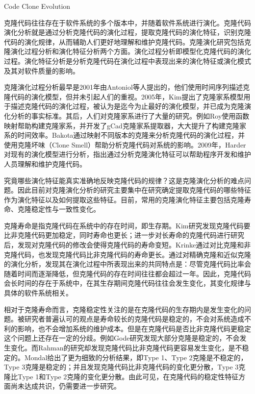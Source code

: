 {Code Clone Evolution}

克隆代码往往存在于软件系统的多个版本中，并随着软件系统进行演化。克隆代码演化分析就是通过分析克隆代码的演化过程，提取克隆代码的演化特征，识别克隆代码的演化规律，从而辅助人们更好地理解和维护克隆代码。克隆演化研究包括克隆演化过程分析和演化特征分析两个方面。演化过程分析即模型化克隆代码的演化过程。演化特征分析是分析克隆代码在演化过程中表现出来的演化特征或演化模式及其对软件质量的影响。

克隆演化过程分析最早是2001年由Antoniol等人提出的，他们使用时间序列描述克隆代码的演化模型\cite{antoniol2001modeling}，但并未引起人们的重视。2005年，Kim提出了克隆家系模型用于描述克隆代码的演化过程，被认为是迄今为止最好的演化模型，并已成为克隆演化分析的事实标准\cite{kim2005empirical}。其后，人们对克隆家系进行了大量的研究。例如Roy使用函数映射帮助构建克隆家系，并开发了gCad克隆家系提取器，大大提升了构建克隆家系的时间效率\cite{saha2011automatic}。Bakota通过映射不同版本的克隆来分析克隆代码的演化过程，并使用克隆坏味（Clone Smell）帮助分析克隆代码对系统的影响\cite{bakota2011tracking}。2009年，Harder对现有的演化模型进行分析\cite{harder2009modeling}，指出通过分析克隆演化特征可以帮助程序开发和维护人员理解和维护克隆代码。

究竟哪些演化特征能真实准确地反映克隆代码的规律？这是克隆演化分析的难点问题。因此目前对克隆演化分析的研究主要集中在研究确定提取克隆代码的哪些特征作为演化特征以及如何提取这些特征。目前，常用的克隆演化特征主要包括克隆寿命、克隆稳定性与一致性变化。

克隆寿命是指克隆代码在系统中的存在时间，即生存期。Kim研究发现克隆代码要比非克隆代码更加稳定，同时寿命也更长\cite{kim2005empirical}；进一步对长寿命的克隆代码进行研究后，发现对克隆代码的修改会使得克隆代码的寿命变短\cite{cai2011empirical}。Krinke通过对比克隆和非克隆代码，也发现克隆代码比非克隆代码的寿命更长\cite{krinke2011cloned}。通过对精确克隆和近似克隆的演化分析，发现其在演化过程中所表现出来的共同特点是：尽管克隆代码比率会随着时间而逐渐降低，但克隆代码的存在时间往往都会超过一年\cite{bazrafshan2012evolution}。因此，克隆代码会长时间的存在于系统中，在其生存期间克隆代码往往会发生变化，其变化规律与具体的软件系统相关\cite{gode2009evolution}。

相对于克隆寿命而言，克隆稳定性关注的是在克隆代码的生存期内是发生变化的问题。被研究者普遍认可的观点是寿命较长的克隆代码是稳定的\cite{krinke2008cloned}\cite{gode2011clone}\cite{harder2013cloned}，不会对系统造成不利的影响，也不会增加系统的维护成本。但是在克隆代码是否比非克隆代码更稳定这个问题上还存在一定的分歧。例如Gode研究发现大部分克隆是稳定的，不会发生变化\cite{gode2011frequency}。而Rahman的研究却发现克隆代码比非克隆代码更容易发生变化，是不稳定的\cite{rahman2014change}。Mondal给出了更为细致的分析结果，即Type 1、Type 2克隆是不稳定的，Type 3克隆是稳定的；并且发现克隆代码比非克隆代码的变化更分散，Type 3克隆比Type 1和Type 2克隆的变化更分散\cite{mondal2012comparative}\cite{mondal2012dispersion}。由此可见，在克隆代码的稳定性特征方面尚未达成共识，仍需要进一步研究。

